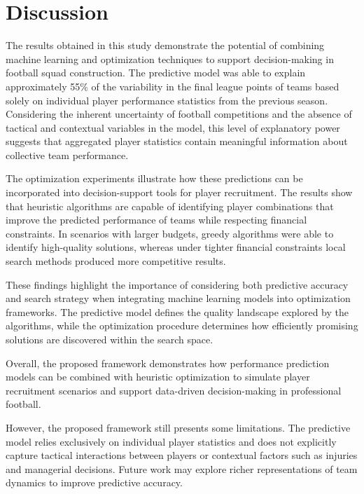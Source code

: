 \documentclass[12pt]{article}
\begin{document}
\section{Discussion}

The results obtained in this study demonstrate the potential of combining machine learning and optimization techniques to support decision-making
in football squad construction. The predictive model was able to explain approximately 55\% of the variability in the final league points of teams
based solely on individual player performance statistics from the previous season. Considering the inherent uncertainty of football
competitions and the absence of tactical and contextual variables in the model, this level of explanatory power suggests that aggregated player
statistics contain meaningful information about collective team performance.

The optimization experiments illustrate how these predictions can be incorporated into decision-support tools for player recruitment.
The results show that heuristic algorithms are capable of identifying player combinations that improve the predicted performance of teams
while respecting financial constraints. In scenarios with larger budgets, greedy algorithms were able to identify high-quality
solutions, whereas under tighter financial constraints local search methods produced more competitive results.

These findings highlight the importance of considering both predictive accuracy and search strategy when integrating machine learning models
into optimization frameworks. The predictive model defines the quality landscape explored by the algorithms, while the optimization procedure
determines how efficiently promising solutions are discovered within the search space.

Overall, the proposed framework demonstrates how performance prediction models can be combined with heuristic optimization to simulate player
recruitment scenarios and support data-driven decision-making in professional football.

However, the proposed framework still presents some limitations. The predictive model relies exclusively on individual player statistics and
does not explicitly capture tactical interactions between players or contextual factors such as injuries and managerial decisions. Future work may explore
richer representations of team dynamics to improve predictive accuracy.
\end{document}
